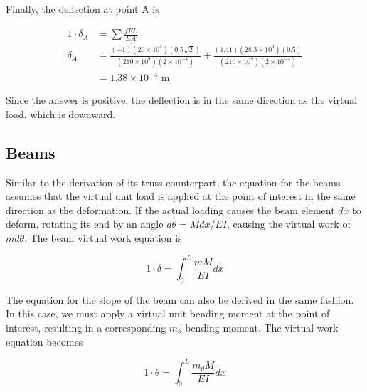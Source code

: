 \documentclass[
fontsize=10pt,
a4paper,
twosides=false,
open=any,
svgnames,
]{kaobook} %
\begin{document}
\begin{example}
  Finally, the deflection at point A is

  \begin{align*}
    1 \cdot \delta_A &= \sum \frac{fFL}{EA} \\
    \delta_A &= \frac{(-1)(20 \times 10^3)(0.5\sqrt{2})}{(210 \times 10^9)(2 \times 10^{-4})} + \frac{(1.41)(28.3 \times 10^3)(0.5)}{(210 \times 10^9)(2 \times 10^{-4})} \\
                     &= 1.38 \times 10^{-4} \text{ m}
  \end{align*}

  Since the answer is positive, the deflection is in the same direction as the virtual load, which is downward.
  
\end{example}

\subsection{Beams}

Similar to the derivation of its truss counterpart, the equation for the beams assumes that the virtual unit load is applied at the point of interest in the same direction as the deformation. If the actual loading causes the beam element $dx$ to deform, rotating its end by an angle $d\theta = M dx / EI$, causing the virtual work of $m d\theta$. The beam virtual work equation is

\begin{equation}
  1 \cdot \delta = \int_0^L \frac{mM}{EI} dx
\end{equation}

The equation for the slope of the beam can also be derived in the same fashion. In this case, we must apply a virtual unit bending moment at the point of interest, resulting in a corresponding $m_\theta$ bending moment. The virtual work equation becomes

\begin{equation}
  1 \cdot \theta = \int_0^L \frac{m_\theta M}{EI} dx
\end{equation}
\end{document}
